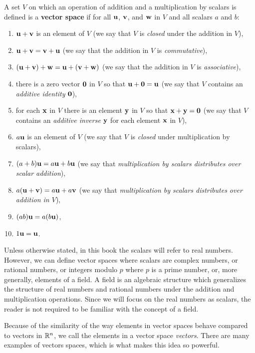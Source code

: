 \begin{definition} \label{def:vector_space} A set $V$ on which an operation of addition and a multiplication by scalars is defined is a \textbf{vector space} if for all $\mathbf{u}$, $\mathbf{v}$, and $\mathbf{w}$ in $V$ and all scalars $a$ and $b$:
\begin{enumerate}
\item $\mathbf{u} + \mathbf{v}$ is an element of $V$ (we say that $V$ is \emph{closed} under the addition in $V$),
\item $\mathbf{u} + \mathbf{v} = \mathbf{v} + \mathbf{u}$ (we say that the addition in $V$ is \emph{commutative}),
\item $(\mathbf{u} + \mathbf{v}) + \mathbf{w} = \mathbf{u} + (\mathbf{v} + \mathbf{w})$ (we say that the addition in $V$ is \emph{associative}),
\item there is a zero vector $\mathbf{0}$ in $V$ so that $\mathbf{u} + \mathbf{0} = \mathbf{u}$ (we say that $V$ contains an \emph{additive identity} $\mathbf{0}$),
\item for each $\mathbf{x}$ in $V$ there is an element $\mathbf{y}$ in $V$ so that $\mathbf{x} + \mathbf{y} = \mathbf{0}$ (we say that $V$ contains an \emph{additive inverse} $\mathbf{y}$ for each element $\mathbf{x}$ in $V$),
\item $a \mathbf{u}$ is an element of $V$ (we say that $V$ is \emph{closed} under multiplication by scalars),
\item $(a+b) \mathbf{u} = a\mathbf{u} + b\mathbf{u}$ (we say that \emph{multiplication by scalars distributes over scalar addition}),
\item $a(\mathbf{u} + \mathbf{v}) = a\mathbf{u} + a\mathbf{v}$ (we say that \emph{multiplication by scalars distributes over addition in $V$}),
\item $(ab) \mathbf{u} = a(b\mathbf{u})$,
\item $1 \mathbf{u} = \mathbf{u}$.
\end{enumerate}
\end{definition}

\begin{note} Unless otherwise stated, in this book the scalars will refer to real numbers. However, we can define vector spaces where scalars are complex numbers, or rational numbers, or integers modulo $p$ where $p$ is a prime number, or, more generally, elements of a field. A field is an algebraic structure which generalizes the structure of real numbers and rational numbers under the addition and multiplication operations. Since we will focus on the real numbers as scalars, the reader is not required to be familiar with the concept of a field.
\end{note}

Because of the similarity of the way elements in vector spaces behave compared to vectors in $\mathbb{R}^n$, we call the elements in a vector space \emph{vectors}. There are many examples of vectors spaces, which is what makes this idea so powerful.



